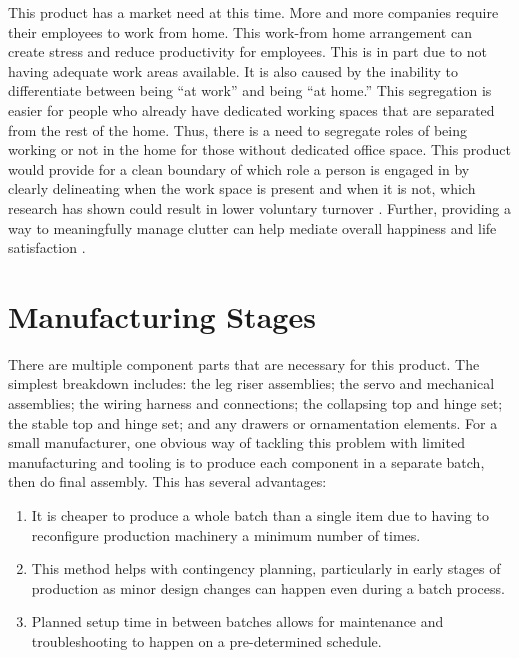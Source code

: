 \documentclass[man]{apa7}
\begin{document}
This product has a market need at this time. More and more companies require their employees to work from home. This work-from home arrangement can create stress and reduce productivity for employees. This is in part due to not having adequate work areas available. It is also caused by the inability to differentiate between being ``at work'' and being ``at home.'' This segregation is easier for people who already have dedicated working spaces that are separated from the rest of the home. Thus, there is a need to segregate roles of being working or not in the home for those without dedicated office space. This product would provide for a clean boundary of which role a person is engaged in by clearly delineating when the work space is present and when it is not, which research has shown could result in lower voluntary turnover \parencite{rubensteinWorkhomeHomeworkConflict2020}. Further, providing a way to meaningfully manage clutter can help mediate overall happiness and life satisfaction \parencite{daoNegativeSideOffice2020} .

\section{Manufacturing Stages}
\label{sec:org47cceba}

There are multiple component parts that are necessary for this product. The simplest breakdown includes: the leg riser assemblies; the servo and mechanical assemblies; the wiring harness and connections; the collapsing top and hinge set; the stable top and hinge set; and any drawers or ornamentation elements. For a small manufacturer, one obvious way of tackling this problem with limited manufacturing and tooling is to produce each component in a separate batch, then do final assembly. This has several advantages:

\begin{enumerate}
\item It is cheaper to produce a whole batch than a single item due to having to reconfigure production machinery a minimum number of times.
\item This method helps with contingency planning, particularly in early stages of production as minor design changes can happen even during a batch process.
\item Planned setup time in between batches allows for maintenance and troubleshooting to happen on a pre-determined schedule.
\end{enumerate}
\end{document}
